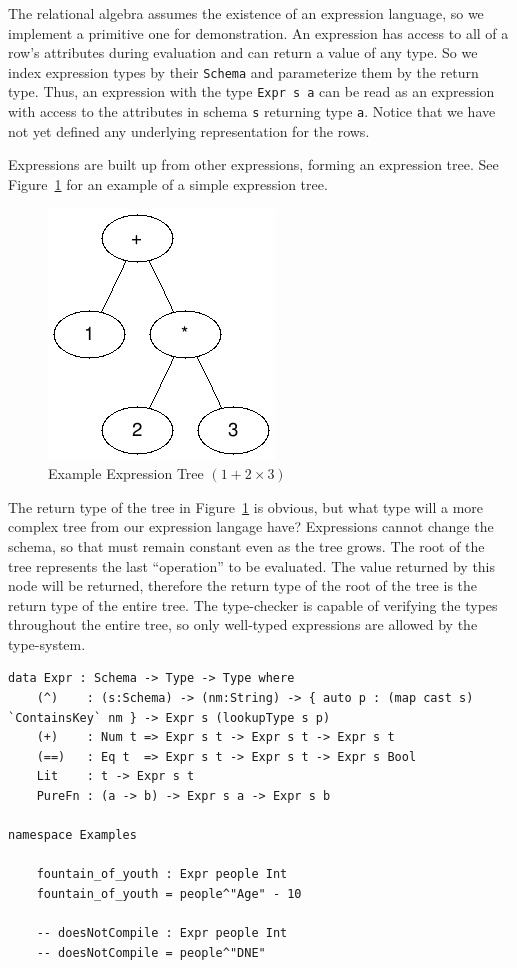 \documentclass[12pt]{article}
\begin{document}
The relational algebra assumes the existence of an expression language, so we implement a primitive one for demonstration.
An expression has access to all of a row's attributes during evaluation and can return a value of any type.
So we index expression types by their \texttt{Schema} and parameterize them by the return type.
Thus, an expression with the type \texttt{Expr s a} can be read as an expression with access to the attributes in schema \texttt{s} returning type \texttt{a}.
Notice that we have not yet defined any underlying representation for the rows.

Expressions are built up from other expressions, forming an expression tree.
See Figure~\ref{fig:expr_tree} for an example of a simple expression tree.

\begin{figure}[h!]
    \centering
    \includegraphics[width=0.25\linewidth]{assets/expr_tree.png}
    \caption{Example Expression Tree $(1 + 2 \times 3)$}
    \label{fig:expr_tree}
\end{figure}

The return type of the tree in Figure~\ref{fig:expr_tree} is obvious, but what type will a more complex tree from our expression langage have?
Expressions cannot change the schema, so that must remain constant even as the tree grows.
The root of the tree represents the last ``operation'' to be evaluated.
The value returned by this node will be returned, therefore the return type of the root of the tree is the return type of the entire tree.
The type-checker is capable of verifying the types throughout the entire tree, so only well-typed expressions are allowed by the type-system.

\begin{lstlisting}
data Expr : Schema -> Type -> Type where
    (^)    : (s:Schema) -> (nm:String) -> { auto p : (map cast s) `ContainsKey` nm } -> Expr s (lookupType s p)
    (+)    : Num t => Expr s t -> Expr s t -> Expr s t
    (==)   : Eq t  => Expr s t -> Expr s t -> Expr s Bool
    Lit    : t -> Expr s t
    PureFn : (a -> b) -> Expr s a -> Expr s b

namespace Examples

    fountain_of_youth : Expr people Int
    fountain_of_youth = people^"Age" - 10

    -- doesNotCompile : Expr people Int
    -- doesNotCompile = people^"DNE"
\end{lstlisting}
\end{document}
